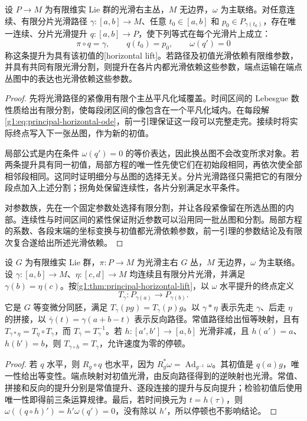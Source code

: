 \begin{theorem}\label{g1:thm:principal-horizontal-lift}
	设 \(P\to M\) 为有限维实 Lie 群的光滑右主丛，\(M\) 无边界，\(\omega\) 为主联络。对任意连续、有限分片光滑路径 \(\gamma:[a,b]\to M\)、任意 \(t_0\in[a,b]\) 和 \(p_0\in P_{\gamma(t_0)}\)，存在唯一连续、分片光滑提升 \(q:[a,b]\to P\)，使下列等式在每个光滑片上成立：
	\[
		\pi\circ q=\gamma,\qquad q(t_0)=p_0,\qquad \omega(q')=0
	\]
	称这条提升为具有该初值的[horizontal lift]。若路径及初值光滑依赖有限维参数，并具有共同有限光滑分割，则提升在各片内都光滑依赖这些参数，端点运输在端点丛图中的表达也光滑依赖这些参数。
\end{theorem}
\begin{proof}
	先将光滑路径的紧像用有限个主丛平凡化域覆盖。时间区间的 Lebesgue 数性质给出有限分割，使每段闭区间的像包含在一个平凡化域内。在每段解\eqref{g1:eq:principal-horizontal-ode}，前一引理保证这一段可以完整走完。接续时将实际终点写入下一张丛图，作为新的初值。

	局部公式是内在条件 \(\omega(q')=0\) 的等价表达，因此换丛图不会改变所求对象。若两条提升具有同一初值，局部方程的唯一性先使它们在初始段相同，再依次使全部相邻段相同。这同时证明细分与丛图的选择无关。分片光滑路径只需把它的有限分段点加入上述分割；拐角处保留连续性，各片分别满足水平条件。

	对参数族，先在一个固定参数处选择有限分割，并让各段紧像留在所选丛图的内部。连续性与时间区间的紧性保证附近参数可以沿用同一批丛图和分割。局部方程的系数、各段末端的坐标变换与初值都光滑依赖参数，前一引理的参数结论及有限次复合遂给出所述光滑依赖。
\end{proof}

\begin{proposition}\label{g1:prop:principal-transport-laws}
	设 \(G\) 为有限维实 Lie 群，\(\pi:P\to M\) 为光滑主右 \(G\) 丛，\(M\) 无边界，\(\omega\) 为主联络。设 \(\gamma:[a,b]\to M\)、\(\eta:[c,d]\to M\) 均连续且有限分片光滑，并满足 \(\gamma(b)=\eta(c)\)。按\cref{g1:thm:principal-horizontal-lift}，以 \(\omega\) 水平提升的终点定义
	\[
		T_\gamma:P_{\gamma(a)}\longrightarrow P_{\gamma(b)}.
	\]
	它是 \(G\) 等变微分同胚，满足 \(T_\gamma(p g)=T_\gamma(p)g\)。以 \(\gamma*\eta\) 表示先走 \(\gamma\)、后走 \(\eta\) 的拼接，以 \(\bar\gamma(t)=\gamma(a+b-t)\) 表示反向路径。常值路径给出恒等映射，且有 \(T_{\gamma*\eta}=T_\eta\circ T_\gamma\)，而 \(T_{\bar\gamma}=T_\gamma^{-1}\)。若 \(h:[a',b']\to[a,b]\) 光滑非减，且 \(h(a')=a\)、\(h(b')=b\)，则 \(T_{\gamma\circ h}=T_\gamma\)，允许速度为零的停顿。
\end{proposition}
\begin{proof}
	若 \(q\) 水平，则 \(R_g\circ q\) 也水平，因为 \(R_g^*\omega=\operatorname{Ad}_{g^{-1}}\omega\)。其初值是 \(q(a)g\)，唯一性给出等变性。端点映射对初值光滑，由反向路径得到的逆映射也光滑。常值、拼接和反向的提升分别是常值提升、逐段连接的提升与反向提升；检验初值后使用唯一性即得前三条运算规律。最后，若时间换元为 \(t=h(\tau)\)，则 \(\omega((q\circ h)')=h'\omega(q')=0\)，没有除以 \(h'\)，所以停顿也不影响结论。
\end{proof}

